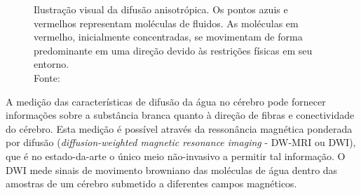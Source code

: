 \documentclass[
    12pt,                %
    oneside,            %
    a4paper,            %
    english,            %
    french,                %
    spanish,            %
    brazil                %
    ]{abntex2}
\begin{document}
\begin{figure}[ht]
\centering
\captionsetup[subfloat]{farskip=0pt,nearskip=0pt}
    \caption{Ilustração visual da difusão anisotrópica. Os pontos azuis e vermelhos representam moléculas de fluidos. As moléculas em vermelho, inicialmente concentradas, se movimentam de forma predominante em uma direção devido às restrições físicas em seu entorno. \\ Fonte: \cite{voltoline2016}
    }
    \label{fig::intro_difusao_anisotropica}
\end{figure}



A medição das características de difusão da água no cérebro pode fornecer informações sobre a substância branca quanto à direção de fibras e conectividade do cérebro. Esta medição é possível através da ressonância magnética ponderada por difusão (\textit{diffusion-weighted magnetic resonance imaging} - DW-MRI ou DWI), que é no estado-da-arte o único meio não-invasivo a permitir tal informação. O DWI mede sinais de movimento browniano das moléculas de água dentro das amostras de um cérebro submetido a diferentes campos magnéticos.
\end{document}

